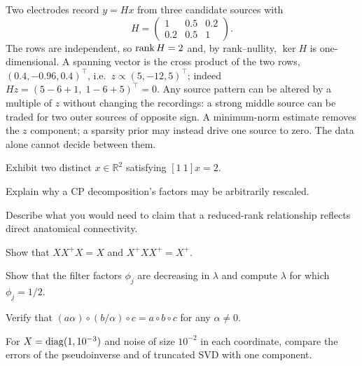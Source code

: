 \begin{workedexample}
Two electrodes record $y=Hx$ from three candidate sources with
\[
H=\begin{pmatrix}1&0.5&0.2\\0.2&0.5&1\end{pmatrix}.
\]
The rows are independent, so $\operatorname{rank} H=2$ and, by rank--nullity, $\ker H$ is one-dimensional. A spanning vector is the cross product of the two rows, $(0.4,-0.96,0.4)^\top$, i.e.\ $z\propto(5,-12,5)^\top$; indeed $Hz=(5-6+1,\;1-6+5)^\top=0$. Any source pattern can be altered by a multiple of $z$ without changing the recordings: a strong middle source can be traded for two outer sources of opposite sign. A minimum-norm estimate removes the $z$ component; a sparsity prior may instead drive one source to zero. The data alone cannot decide between them.
\end{workedexample}
\begin{exercises}
\item Exhibit two distinct $x\in\mathbb R^2$ satisfying $[1\ 1]x=2$.
\item Explain why a CP decomposition's factors may be arbitrarily rescaled.
\item Describe what you would need to claim that a reduced-rank relationship reflects direct anatomical connectivity.
\item Show that $XX^+X=X$ and $X^+XX^+=X^+$.
\item Show that the filter factors $\phi_j$ are decreasing in $\lambda$ and compute $\lambda$ for which $\phi_j=1/2$.
\item Verify that $(a\alpha)\circ(b/\alpha)\circ c=a\circ b\circ c$ for any $\alpha\ne0$.
\item For $X=\operatorname{diag}(1,10^{-3})$ and noise of size $10^{-2}$ in each coordinate, compare the errors of the pseudoinverse and of truncated SVD with one component.
\end{exercises}
